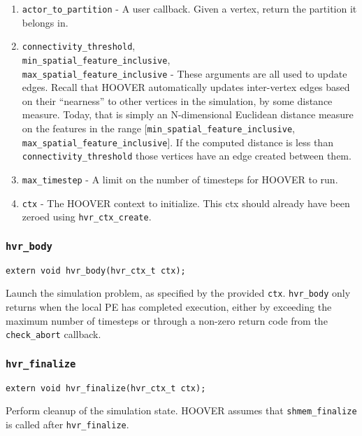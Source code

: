 \begin{enumerate}
    \item \texttt{actor\_to\_partition} - A user callback. Given a vertex,
        return the partition it belongs in.
    \item \texttt{connectivity\_threshold}, \\
        \texttt{min\_spatial\_feature\_inclusive}, \\
        \texttt{max\_spatial\_feature\_inclusive} - These arguments are all used
        to update edges. Recall that HOOVER automatically updates inter-vertex
        edges based on their ``nearness'' to other vertices in the simulation,
        by some distance measure. Today, that is simply an N-dimensional
        Euclidean distance measure on the features in the range
        [\texttt{min\_spatial\_feature\_inclusive},
        \texttt{max\_spatial\_feature\_inclusive}]. If the computed distance is
        less than \texttt{connectivity\_threshold} those vertices have an edge
        created between them.
    \item \texttt{max\_timestep} - A limit on the number of timesteps for HOOVER
        to run.
    \item \texttt{ctx} - The HOOVER context to initialize. This ctx should
        already have been zeroed using \texttt{hvr\_ctx\_create}.
\end{enumerate}

\subsubsection{\texttt{hvr\_body}}

\begin{verbatim}
extern void hvr_body(hvr_ctx_t ctx);
\end{verbatim}

Launch the simulation problem, as specified by the provided \texttt{ctx}.
\texttt{hvr\_body} only returns when the local PE has completed execution,
either by exceeding the maximum number of timesteps or through a non-zero return
code from the \texttt{check\_abort} callback.

\subsubsection{\texttt{hvr\_finalize}}

\begin{verbatim}
extern void hvr_finalize(hvr_ctx_t ctx);
\end{verbatim}

Perform cleanup of the simulation state. HOOVER assumes that
\texttt{shmem\_finalize} is called after \texttt{hvr\_finalize}.

